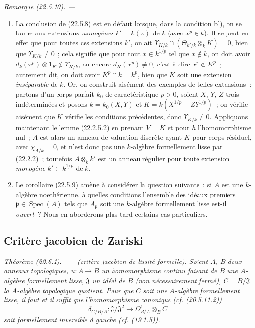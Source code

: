 \documentclass[10pt,oneside]{book}
\makeatletter
\newcommand{\setmanualcurrentlabel}[1]{\def\@currentlabel{#1}}
\newcommand{\oldpage}[2][]{%
  \setcounter{footnote}{0}%
  \marginpar{\scriptsize\textbf{#1}~|~#2}\ignorespaces}
\newenvironment{theorem}[1][]{%
  \setmanualcurrentlabel{#1}\par\medskip\noindent\itshape Théorème (#1). ---\ }{\par}
\newenvironment{remark}[1][]{%
  \setmanualcurrentlabel{#1}\par\medskip\noindent\itshape Remarque (#1). ---\ }{\par}
\makeatother
\begin{document}
\begin{remark}[22.5.10]
\label{0.22.5.10-fr}
\begin{enumerate}
  \item[\rm(i)] La conclusion de (22.5.8) est en défaut lorsque, dans la
  condition b'), on se borne aux extensions \emph{monogènes} $k'=k(x)$ de $k$
  (avec $x^p\in k$). Il se peut en effet que pour toutes ces extensions $k'$,
  on ait
  $\Upsilon_{K/k}\cap(\Theta_{k'/k}\otimes_kK)=0$, bien que
  $\Upsilon_{K/k}\neq0$~; cela signifie que pour tout $x\in k^{1/p}$ tel que
  $x\notin k$, on doit avoir
  $d_k(x^p)\otimes1_K\notin\Upsilon_{K/k}$, ou encore $d_K(x^p)\neq0$,
  c'est-à-dire $x^p\notin K^p$~; autrement dit, on doit avoir
  $K^p\cap k=k^p$, bien que $K$ soit une extension \emph{inséparable} de $k$.
  Or, on construit aisément des exemples de telles extensions~: partons d'un
  corps parfait $k_0$ de caractéristique $p>0$, soient $X$, $Y$, $Z$ trois
  indéterminées et posons $k=k_0(X,Y)$ et
  $K=k(X^{1/p}+ZY^{1/p})$~; on vérifie aisément que $K$ vérifie les conditions
  précédentes, donc $\Upsilon_{K/k}\neq0$. Appliquons maintenant le lemme
  (22.2.5.2) en prenant $V=K$ et pour $h$ l'homomorphisme nul~; $A$ est alors
  un anneau de valuation discrète ayant $K$ pour corps résiduel, avec
  $\chi_{A/k}=0$, et n'est donc pas une $k$-algèbre formellement lisse par
  (22.2.2)~; toutefois $A\otimes_kk'$ est un anneau régulier pour toute
  extension \emph{monogène} $k'\subset k^{1/p}$ de $k$.

  \oldpage[0\textsubscript{IV-1}]{205}

  \item[\rm(ii)] Le corollaire (22.5.9) amène à considérer la question
  suivante~: si $A$ est une $k$-algèbre noethérienne, à quelles conditions
  l'ensemble des idéaux premiers $\mathfrak p\in\operatorname{Spec}(A)$ tels que
  $A_{\mathfrak p}$ soit une $k$-algèbre formellement lisse est-il
  \emph{ouvert}~? Nous en aborderons plus tard certains cas particuliers.
\end{enumerate}
\end{remark}

\subsection{Critère jacobien de Zariski}
\label{subsection:0.22.6-fr}

\begin{theorem}[22.6.1]
\label{0.22.6.1-fr}
\textnormal{(critère jacobien de lissité formelle).}
Soient $A$, $B$ deux anneaux topologiques,
$u:A\longrightarrow B$ un homomorphisme continu faisant de $B$ une
$A$-algèbre formellement lisse, $\mathfrak J$ un idéal de $B$ (non
nécessairement fermé), $C=B/\mathfrak J$ la $A$-algèbre topologique quotient.
Pour que $C$ soit une $A$-algèbre formellement lisse, il faut et il suffit que
l'homomorphisme canonique (cf. (20.5.11.2))
\begin{equation}
\label{0.22.6.1.1-fr}
  \delta_{C/B/A}:\mathfrak J/\mathfrak J^2
  \longrightarrow\Omega^1_{B/A}\otimes_BC
  \tag{22.6.1.1}
\end{equation}
soit \emph{formellement inversible à gauche} (cf. (19.1.5)).
\end{theorem}
\end{document}
